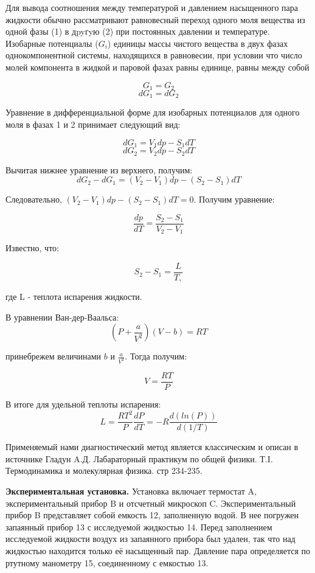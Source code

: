 \documentclass[a4paper,10pt]{article} %
\begin{document}
Для вывода соотношения между температурой и давлением насыщенного пара жидкости обычно рассматривают равновесный переход одного моля вещества из одной фазы (1) в дpyгyю (2) при постоянных давлении и температуре. Изобарные потенциалы ($G_i$) единицы массы чистого вещества в двух фазах однокомпонентной системы, находящихся в равновесии, при условии что
число молей компонента в жидкой и паровой фазах равны единице, равны между собой

\[G_1 = G_2\]
\[dG_1 = dG_2\]

Уравнение в дифференциальной форме для  изобарных потенциалов для одного моля в фазах 1 и 2 принимает следующий вид:

\[dG_1 = V_1dp - S_1dT\]
\[dG_2 = V_2dp - S_2dT\]

Вычитая нижнее уравнение из верхнего, получим:
\[dG_2 - dG_1 = (V_2-V_1)dp - (S_2-S_1)dT \]

Следовательно, $(V_2-V_1)dp - (S_2 - S_1)dT = 0$.
Получим уравнение:

\[\frac{dp}{dT} = \frac{S_2 - S_1}{V_2-V_1}\]

Известно, что:

\[S_2 - S_1 = \frac{L}{T,}\]

где L - теплота испарения жидкости.

В уравнении Ван-дер-Ваальса:
\[(P+\frac{a}{V^2})(V-b) = RT\]

принебрежем величинами $b$ и $\frac{a}{V^2}$. Тогда получим: 

\[V = \frac{RT}{P}\]

В итоге для удельной теплоты испарения: 
\[L = \frac{RT^2}{P}\frac{dP}{dT} = -R\frac{d(ln(P))}{d(1/T)}\]



Применяемый нами диагностический метод является классическим и описан в источнике Гладун A.Д. Лабараторный практикум по общей физики. Т.I. Термодинамика и молекулярная физика. стр 234-235.



\medskip

\textbf{Экспериментальная установка.}
Установка включает термостат A, экспериментальный прибор B и отсчетный микроскоп C. Экспериментальный прибор B представляет собой емкость 12, заполненную водой. В нее погружен запаянный прибор 13 с исследуемой жидкостью 14. Перед заполнением исследуемой жидкости воздух
из запаянного прибора был удален, так что над жидкостью находится только её насыщенный пар.
Давление пара определяется по ртутному манометру 15, соединенному с емкостью 13.
\end{document}
